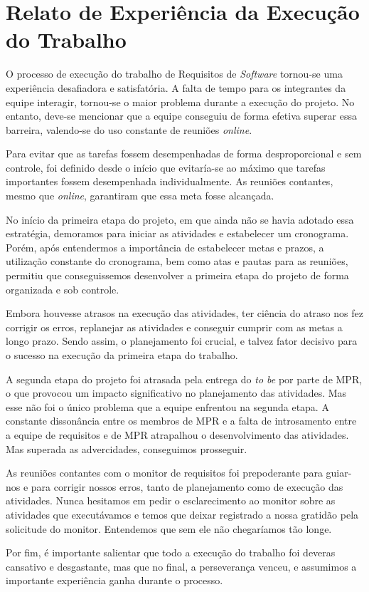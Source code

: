 \chapter{Relato de Experiência da Execução do Trabalho}

O processo de execução do trabalho de Requisitos de \emph{Software} tornou-se uma experiência desafiadora e satisfatória. A falta de tempo para os integrantes da equipe interagir, tornou-se o maior problema durante a execução do projeto. No entanto, deve-se mencionar que a equipe conseguiu de forma efetiva superar essa barreira, valendo-se do uso constante de reuniões \emph{online}.

Para evitar que as tarefas fossem desempenhadas de forma desproporcional e sem controle, foi definido desde o início que evitaría-se ao máximo que tarefas importantes fossem desempenhada individualmente. As reuniões contantes, mesmo que \emph{online}, garantiram que essa meta fosse alcançada.

No início da primeira etapa do projeto, em que ainda não se havia adotado essa estratégia, demoramos para iniciar as atividades e estabelecer um cronograma. Porém, após entendermos a importância de estabelecer metas e prazos, a utilização constante do cronograma, bem como atas e pautas para as reuniões, permitiu que conseguissemos desenvolver a primeira etapa do projeto de forma organizada e sob controle.

Embora houvesse atrasos na execução das atividades, ter ciência do atraso nos fez corrigir os erros, replanejar as atividades e conseguir cumprir com as metas a longo prazo. Sendo assim, o planejamento foi crucial, e talvez fator decisivo para o sucesso  na execução  da primeira etapa do trabalho.

A segunda etapa do projeto foi atrasada pela entrega do \emph{to be} por parte de MPR, o que provocou um impacto significativo no planejamento das atividades. Mas esse não foi o único problema que a equipe enfrentou na segunda etapa. A constante dissonância entre os membros de MPR e a falta de introsamento entre a equipe de requisitos e de MPR atrapalhou o desenvolvimento das atividades. Mas superada as advercidades, conseguimos prosseguir.

As reuniões contantes com o monitor de requisitos foi prepoderante para guiar-nos e para corrigir nossos erros, tanto de planejamento como de execução das atividades. Nunca hesitamos em pedir o esclarecimento ao monitor sobre as atividades que executávamos e temos que deixar registrado a nossa gratidão pela solicitude do monitor. Entendemos que sem ele não chegaríamos tão longe.

Por fim, é importante salientar que todo a execução do trabalho foi deveras cansativo e desgastante, mas que no final, a perseverança venceu, e assumimos a importante experiência ganha durante o processo.
